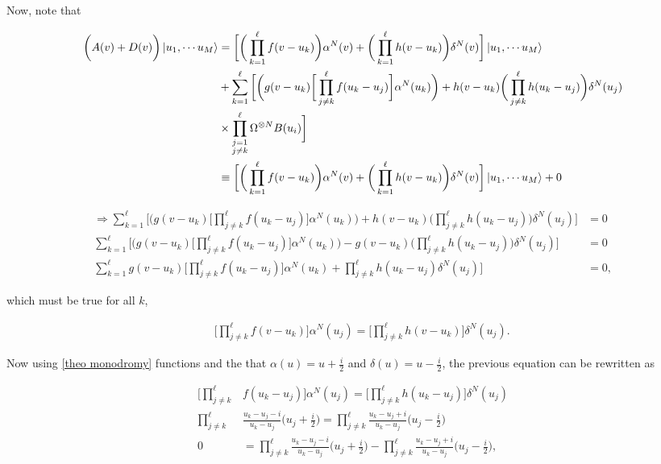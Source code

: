 \documentclass{homework}
\begin{document}
Now, note that 

\begin{align*}
        \bigg(A(v) + D(v) \bigg)\ket{u_1, \cdots u_M} &= \bigg[\bigg(\prod_{k=1}^{\ell} f(v-u_k)\bigg)\alpha^N(v) + \bigg(\prod_{k=1}^{\ell} h(v-u_k)\bigg) \delta^N(v) \bigg] \ket{u_1, \cdots u_M} \\
        &+ \sum_{k=1}^{\ell} \bigg[\bigg(g(v-u_k) \bigg[ \prod_{j \neq k}^{\ell} f(u_k - u_j)\bigg] \alpha^N(u_k)\bigg) + h(v-u_k) \bigg(\prod_{j \neq k}^{\ell} h(u_k - u_j)\bigg) \delta^N(u_j) \\
        &\times \prod_{\substack{j = 1 \\
                                 j \neq k}}^{\ell} \Omega^{\otimes N} B(u_i)\bigg]\\
    &\equiv \bigg[\bigg(\prod_{k=1}^{\ell} f(v-u_k)\bigg)\alpha^N(v) + \bigg(\prod_{k=1}^{\ell} h(v-u_k)\bigg) \delta^N(v) \bigg] \ket{u_1, \cdots u_M} + 0
\end{align*}

\begin{align*}
    \Rightarrow \sum_{k=1}^{\ell} \bigg[\bigg(g(v-u_k) \bigg[ \prod_{j \neq k}^{\ell} f(u_k - u_j)\bigg] \alpha^N(u_k)\bigg) + h(v-u_k) \bigg(\prod_{j \neq k}^{\ell} h(u_k - u_j)\bigg)  \delta^N(u_j) \bigg] &= 0 \\
    \sum_{k=1}^{\ell} \bigg[\bigg(g(v-u_k) \bigg[ \prod_{j \neq k}^{\ell} f(u_k - u_j)\bigg] \alpha^N(u_k)\bigg) - g(v-u_k) \bigg(\prod_{j \neq k}^{\ell} h(u_k - u_j)\bigg)  \delta^N(u_j) \bigg] &= 0 \\
    \sum_{k=1}^{\ell} g(v-u_k) \bigg[ \prod_{j \neq k}^{\ell} f(u_k - u_j)\bigg] \alpha^N(u_k) + \prod_{j \neq k}^{\ell} h(u_k - u_j) \delta^N(u_j) \bigg] &= 0,
\end{align*}

which must be true for all $k$,

\begin{align}
    & & \bigg[\prod_{j \neq k}^{\ell} f(v- u_k)\bigg] \alpha^N(u_j) = \bigg[\prod_{j \neq k}^{\ell} h(v - u_k) \bigg]  \delta^N(u_j).
\end{align}

Now using \cref{theo monodromy} functions and the that $\alpha(u) = u + \frac{i}{2}$ and $\delta(u) = u - \frac{i}{2}$, the previous equation can be rewritten as 

\begin{equation}
    \begin{split}
        \bigg[\prod_{j \neq k}^{\ell} &f(u_k - u_j)\bigg] \alpha^N(u_j) = \bigg[\prod_{j \neq k}^{\ell} h(u_k - u_j) \bigg]  \delta^N(u_j) \\
        \prod_{j \neq k}^{\ell} &\frac{u_k - u_j - i}{u_k - u_j} \bigg(u_j + \frac{i}{2}\bigg) = \prod_{j \neq k}^{\ell} \frac{u_k - u_j + i}{u_k - u_j} \bigg(u_j - \frac{i}{2}\bigg)\\
        0 &= \prod_{j \neq k}^{\ell} \frac{u_k - u_j - i}{u_k - u_j} \bigg(u_j + \frac{i}{2}\bigg) - \prod_{j \neq k}^{\ell} \frac{u_k - u_j + i}{u_k - u_j} \bigg(u_j - \frac{i}{2}\bigg),
    \end{split}
\end{equation}
\end{document}

